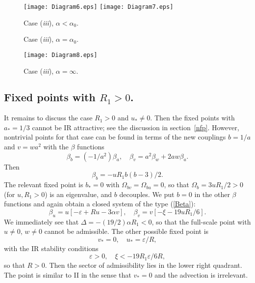 \documentclass[12pt]{iopart}
\begin{document}
\begin{figure}
\texttt{[image: Diagram6.eps]}
{}\hfill{}
\texttt{[image: Diagram7.eps]}
\parbox[t]{0.45\textwidth}{\caption{Case ({\it iii}), $\alpha<\alpha_{0}$.}
\label{fig6}}
{}\hfill{}
\parbox[t]{0.45\textwidth}{\caption{Case ({\it iii}), $\alpha=\alpha_{0}$.}
\label{fig7}}
\end{figure}


\begin{figure}
\begin{center}
\texttt{[image: Diagram8.eps]}
\caption{Case ({\it iii}), $\alpha=\infty$.}
\label{fig8}
\end{center}
\end{figure}


\subsection{Fixed points with $R_{1}>0$.} \label{gR1}


It remains to discuss the case $R_{1}>0$ and $u_{*} \ne 0$. Then the fixed
points with $a_{*}=1/3$ cannot be IR attractive; see the discussion in
section~\ref{nfp}. However, nontrivial points for that case can be found
in terms of the new couplings $b=1/a$ and $v = wa^{2}$ with the $\beta$
functions
\begin{equation}
\beta_{b}= (-1/a^{2}) \beta_{a}, \quad
\beta_{v}= a^{2}\beta_{w}+ 2aw \beta_{a}.
\label{newB}
\end{equation}
Then
\begin{equation}
\beta_{b}= - uR_{1} b(b-3)/2.
\label{newBa}
\end{equation}
The relevant fixed point is $b_{*}=0$ with $\Omega_{bv}=\Omega_{bu}=0$, so
that $\Omega_{b}=3uR_{1}/2>0$ (for $u,R_{1}>0$) is an eigenvalue, and
$b$ decouples. We put $b=0$ in the other $\beta$ functions and again
obtain a closed system of the type (\ref{Beta}):
\begin{equation}
\beta_{u} = u[-\varepsilon+Ru-3\alpha v], \quad
\beta_{v} = v[-\xi - 19 uR_{1}/6].
\label{Bet2}
\end{equation}
We immediately see that $\Delta = - (19/2)\alpha R_{1} <0$, so that
the full-scale point with $u \ne 0$, $w \ne 0$ cannot be admissible.
The other possible fixed point is
\begin{equation}
v_{*}=0, \quad u_{*}= \varepsilon/R,
\label{b=0}
\end{equation}
with the IR stability conditions
\begin{equation}
 \varepsilon>0, \quad \xi< -  19R_{1} \varepsilon/6R,
\label{Bet3}
\end{equation}
so that $R>0$. Then the sector of admissibility lies in the lower right
quadrant. The point is similar to II in the sense that $v_{*}=0$ and the
advection is irrelevant.
\end{document}
